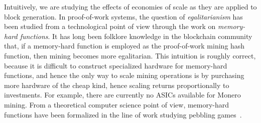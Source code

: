 Intuitively, we are studying the effects of economies of scale as they are
applied to block generation.
In proof-of-work systems, the question of \emph{egalitarianism} has been studied
from a technological point of view through the work on \emph{memory-hard functions}. It
has long been folklore knowledge in the blockchain community that, if a
memory-hard function is employed as the proof-of-work mining hash function, then
mining becomes more egalitarian. This intuition is roughly correct, because
it is difficult to construct specialized hardware for memory-hard functions, and
hence the only way to scale mining operations is by purchasing more hardware of
the cheap kind, hence scaling returns proportionally to investments. For
example, there are currently no ASICs available for Monero mining. From a theoretical computer
science point of view, memory-hard functions have been formalized in the line of
work studying pebbling games~\cite{pebbling}.


